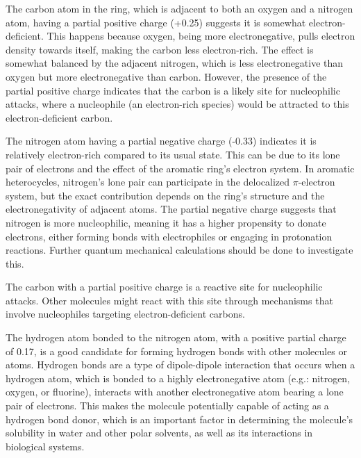 The carbon atom in the ring, which is adjacent to both an oxygen and a nitrogen atom, having a partial positive charge (+0.25) suggests it is somewhat electron-deficient. This happens because oxygen, being more electronegative, pulls electron density towards itself, making the carbon less electron-rich. The effect is somewhat balanced by the adjacent nitrogen, which is less electronegative than oxygen but more electronegative than carbon. However, the presence of the partial positive charge indicates that the carbon is a likely site for nucleophilic attacks, where a nucleophile (an electron-rich species) would be attracted to this electron-deficient carbon.

The nitrogen atom having a partial negative charge (-0.33) indicates it is relatively electron-rich compared to its usual state. This can be due to its lone pair of electrons and the effect of the aromatic ring's electron system. In aromatic heterocycles, nitrogen's lone pair can participate in the delocalized $\pi$-electron system, but the exact contribution depends on the ring's structure and the electronegativity of adjacent atoms. The partial negative charge suggests that nitrogen is more nucleophilic, meaning it has a higher propensity to donate electrons, either forming bonds with electrophiles or engaging in protonation reactions. Further quantum mechanical calculations should be done to investigate this.

The carbon with a partial positive charge is a reactive site for nucleophilic attacks. Other molecules might react with this site through mechanisms that involve nucleophiles targeting electron-deficient carbons. 

The hydrogen atom bonded to the nitrogen atom, with a positive partial charge of 0.17, is a good candidate for forming hydrogen bonds with other molecules or atoms. Hydrogen bonds are a type of dipole-dipole interaction that occurs when a hydrogen atom, which is bonded to a highly electronegative atom (e.g.: nitrogen, oxygen, or fluorine), interacts with another electronegative atom bearing a lone pair of electrons. This makes the molecule potentially capable of acting as a hydrogen bond donor, which is an important factor in determining the molecule's solubility in water and other polar solvents, as well as its interactions in biological systems.


